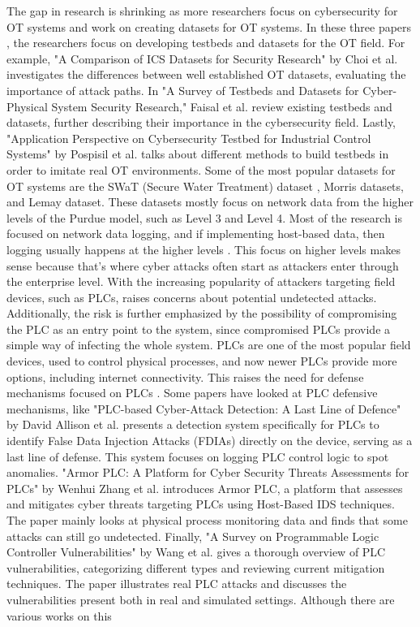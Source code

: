 \documentclass[Master,BMR,english]{twbook}
\begin{document}
The gap in research is shrinking as more researchers focus on cybersecurity for OT systems and work on creating datasets for OT systems. In these three papers\cite{conti_survey_2021} \cite{pospisil_application_2021} \cite{luiijf_comparison_2019}, the researchers focus on developing testbeds and datasets for the OT field.  For example, "A Comparison of ICS Datasets for Security Research" by Choi et al. investigates the differences between well established OT datasets, evaluating the importance of attack paths.  In "A Survey of Testbeds and Datasets for Cyber-Physical System Security Research," Faisal et al. review existing testbeds and datasets, further describing their importance in the cybersecurity field. Lastly, "Application Perspective on Cybersecurity Testbed for Industrial Control Systems" by Pospisil et al. talks about different methods to build testbeds in order to imitate real OT environments. Some of the most popular datasets for OT systems are  the SWaT (Secure Water Treatment) dataset \cite{havarneanu_dataset_2017}, Morris datasets\cite{borges_hink_machine_2014}, and Lemay dataset\cite{lemay_providing_nodate}.  These datasets mostly focus on network data from the higher levels of the Purdue model, such as Level 3 and Level 4. Most of the research is focused on network data logging, and if implementing host-based data, then logging usually happens at the higher levels \cite{conti_survey_2021}. This focus on higher levels makes sense because that's where cyber attacks often start as attackers enter through the enterprise level. With the increasing popularity of attackers targeting field devices, such as PLCs, raises concerns about potential undetected attacks. Additionally, the risk is further emphasized by the possibility of compromising the PLC as an entry point to the system, since compromised PLCs provide a simple way of infecting the whole system. PLCs are one of the most popular field devices, used to control physical processes, and now newer PLCs provide more options, including internet connectivity. This raises the need for defense mechanisms focused on PLCs \cite{conti_survey_2021}\cite{wang_survey_2023} \cite{allison_plc-based_nodate}. Some papers have looked at PLC defensive mechanisms, like "PLC-based Cyber-Attack Detection: A Last Line of Defence" by David Allison et al.\cite{allison_plc-based_nodate} presents a detection system specifically for PLCs to identify False Data Injection Attacks (FDIAs) directly on the device, serving as a last line of defense. This system focuses on logging PLC control logic to spot anomalies. "Armor PLC: A Platform for Cyber Security Threats Assessments for PLCs" by Wenhui Zhang et al.\cite{zhang_armor_2019} introduces Armor PLC, a platform that assesses and mitigates cyber threats targeting PLCs using Host-Based IDS techniques. The paper mainly looks at physical process monitoring data and finds that some attacks can still go undetected. Finally, "A Survey on Programmable Logic Controller Vulnerabilities" by Wang et al.\cite{wang_survey_2023} gives a thorough overview of PLC vulnerabilities, categorizing different types and reviewing current mitigation techniques. The paper illustrates real PLC attacks and discusses the vulnerabilities present both in real and simulated settings. Although there are various works on this 
\end{document}
